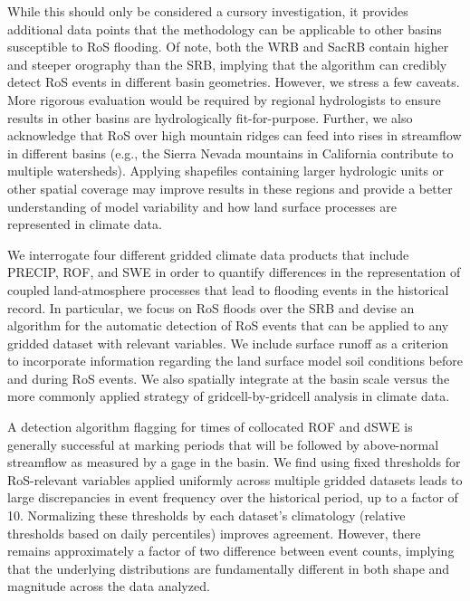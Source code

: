 \documentclass[nhess, manuscript]{copernicus}
\begin{document}
While this should only be considered a cursory investigation, it provides additional data points that the methodology can be applicable to other basins susceptible to RoS flooding.
Of note, both the WRB and SacRB contain higher and steeper orography than the SRB, implying that the algorithm can credibly detect RoS events in different basin geometries.
However, we stress a few caveats. More rigorous evaluation would be required by regional hydrologists to ensure results in other basins are hydrologically fit-for-purpose.
Further, we also acknowledge that RoS over high mountain ridges can feed into rises in streamflow in different basins (e.g., the Sierra Nevada mountains in California contribute to multiple watersheds).
Applying shapefiles containing larger hydrologic units or other spatial coverage may improve results in these regions and provide a better understanding of model variability and how land surface processes are represented in climate data.

\conclusions

We interrogate four different gridded climate data products that include PRECIP, ROF, and SWE in order to quantify differences in the representation of coupled land-atmosphere processes that lead to flooding events in the historical record.
In particular, we focus on RoS floods over the SRB and devise an algorithm for the automatic detection of RoS events that can be applied to any gridded dataset with relevant variables.
We include surface runoff as a criterion to incorporate information regarding the land surface model soil conditions before and during RoS events.
We also spatially integrate at the basin scale versus the more commonly applied strategy of gridcell-by-gridcell analysis in climate data.

A detection algorithm flagging for times of collocated ROF and dSWE is generally successful at marking periods that will be followed by above-normal streamflow as measured by a gage in the basin.
We find using fixed thresholds for RoS-relevant variables applied uniformly across multiple gridded datasets leads to large discrepancies in event frequency over the historical period, up to a factor of 10.
Normalizing these thresholds by each dataset's climatology (relative thresholds based on daily percentiles) improves agreement.
However, there remains approximately a factor of two difference between event counts, implying that the underlying distributions are fundamentally different in both shape and magnitude across the data analyzed.
\end{document}
